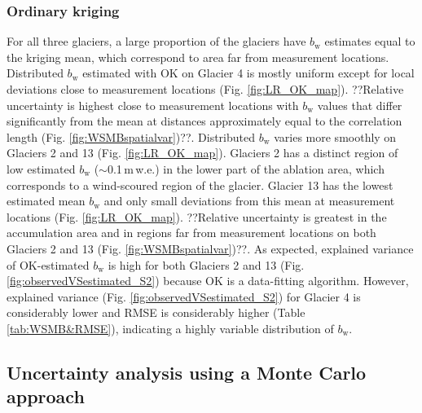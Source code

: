 \documentclass[twocolumn, letterpaper]{igs}
\begin{document}
\subsubsection{Ordinary kriging}

For all three glaciers, a large proportion of the glaciers have $b_\mathrm{w}$ estimates equal to the kriging mean, which correspond to area far from measurement locations. Distributed $b_\mathrm{w}$ estimated with OK on Glacier 4 is mostly uniform except for local deviations close to measurement locations (Fig. \ref{fig:LR_OK_map}). ??Relative uncertainty is highest close to measurement locations with $b_\mathrm{w}$ values that differ significantly from the mean at distances approximately equal to the correlation length (Fig. \ref{fig:WSMBspatialvar})??.
Distributed $b_\mathrm{w}$ varies more smoothly on Glaciers 2 and 13 (Fig. \ref{fig:LR_OK_map}). Glaciers 2 has a distinct region of low estimated $b_\mathrm{w}$ ($\sim$0.1\,m\,w.e.) in the lower part of the ablation area, which corresponds to a wind-scoured region of the glacier. Glacier 13 has the lowest estimated mean $b_\mathrm{w}$ and only small deviations from this mean at measurement locations (Fig. \ref{fig:LR_OK_map}). 
??Relative uncertainty is greatest in the accumulation area and in regions far from measurement locations on both Glaciers 2 and 13 (Fig. \ref{fig:WSMBspatialvar})??. 
As expected, explained variance of OK-estimated $b_\mathrm{w}$ is high for both Glaciers 2 and 13 (Fig. \ref{fig:observedVSestimated_S2}) because OK is a data-fitting algorithm. However, explained variance (Fig. \ref{fig:observedVSestimated_S2}) for Glacier 4 is considerably lower and RMSE is considerably higher (Table \ref{tab:WSMB&RMSE}), indicating a highly variable distribution of $b_\mathrm{w}$.

\subsection{Uncertainty analysis using a Monte Carlo approach}
\end{document}
